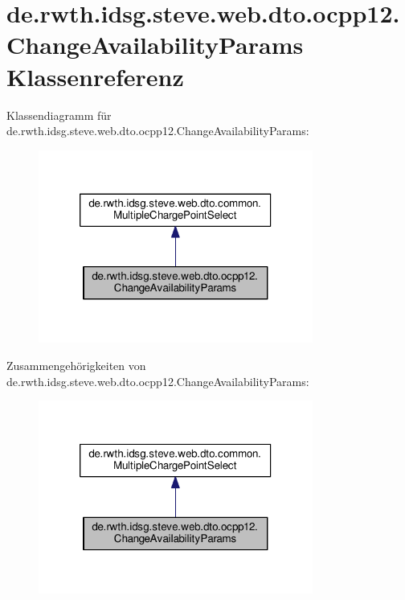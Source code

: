 \hypertarget{classde_1_1rwth_1_1idsg_1_1steve_1_1web_1_1dto_1_1ocpp12_1_1_change_availability_params}{\section{de.\-rwth.\-idsg.\-steve.\-web.\-dto.\-ocpp12.\-Change\-Availability\-Params Klassenreferenz}
\label{classde_1_1rwth_1_1idsg_1_1steve_1_1web_1_1dto_1_1ocpp12_1_1_change_availability_params}
}


Klassendiagramm für de.\-rwth.\-idsg.\-steve.\-web.\-dto.\-ocpp12.\-Change\-Availability\-Params\-:\nopagebreak
\begin{figure}[H]
\begin{center}
\leavevmode
\includegraphics[width=256pt]{classde_1_1rwth_1_1idsg_1_1steve_1_1web_1_1dto_1_1ocpp12_1_1_change_availability_params__inherit__graph}
\end{center}
\end{figure}


Zusammengehörigkeiten von de.\-rwth.\-idsg.\-steve.\-web.\-dto.\-ocpp12.\-Change\-Availability\-Params\-:\nopagebreak
\begin{figure}[H]
\begin{center}
\leavevmode
\includegraphics[width=256pt]{classde_1_1rwth_1_1idsg_1_1steve_1_1web_1_1dto_1_1ocpp12_1_1_change_availability_params__coll__graph}
\end{center}
\end{figure}
